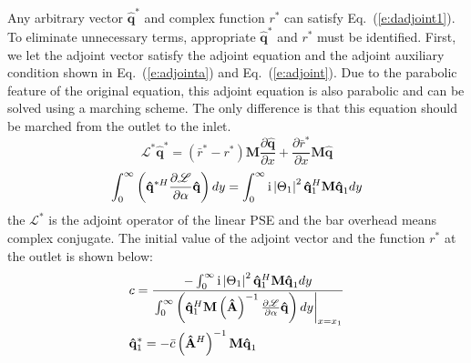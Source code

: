 Any arbitrary vector $\mathbf{\hat q}^*$ and complex function $r^*$ can satisfy Eq.~(\ref{e:dadjoint1}). To eliminate unnecessary terms, appropriate $\mathbf{\hat q}^*$ and $r^*$ must be identified.  First, we let the adjoint vector satisfy the adjoint equation and the adjoint auxiliary condition shown in Eq.~{(\ref{e:adjointa}) and Eq.~{(\ref{e:adjoint})}. Due to the parabolic feature of the original equation, this adjoint equation is also parabolic and can be solved using a marching scheme. The only difference is that this equation should be marched from the outlet to the inlet.
\begin{equation}
\label{e:adjoint}
\mathscr{L}^* {\mathbf{\hat q}}^*  = \left( {\bar r^*  - r^* } \right){\mathbf{M}}\frac{{\partial {\mathbf{\hat q}}}}
{{\partial x}} + \frac{{\partial \bar r^* }}
{{\partial x}}{\mathbf{M\hat q}}
\end{equation}
\begin{equation}
\label{e:adjointa}
\int_0^\infty  {\left( {\mathbf{\hat q} ^{*H} \frac{{\partial {\mathscr{L}}}}
{{\partial \alpha }}\mathbf{\hat q} } \right)dy}  = \int_0^\infty  {{\rm i}\left| {\Theta _1 } \right|^2 \mathbf{\hat q} _1 ^H \mathbf{M\hat q} _1 dy}
\end{equation}
the $\mathscr{L}^*$ is the adjoint operator of the linear PSE and the bar overhead means complex conjugate. The initial value of the adjoint vector and the function $r^*$ at the outlet is shown below:
\begin{equation}
\label{e:adjointini}
\begin{gathered}
c = \frac{{ - \int_0^\infty  {{\rm i}\left| {\Theta _1 } \right|^2 {\mathbf{\hat q}}_1 ^H {\mathbf{M\hat q}}_1 dy} }}
{{\left. {\int_0^\infty  {\left( {{\mathbf{\hat q}}_1 ^H {\mathbf{M}}\left( {{\mathbf{\hat A}}} \right)^{ - 1} \frac{{\partial {\mathscr{L}}}}{{\partial \alpha }}{\mathbf{\hat q}}} \right)dy} } \right|_{x = x_1 } }} \hfill \\
{\mathbf{\hat q}}^* _1  =  - \bar c\left( {{\mathbf{\hat A}}^H } \right)^{ - 1} {\mathbf{M\hat q}}_1  \hfill \\

\end{gathered}
\end{equation}}
